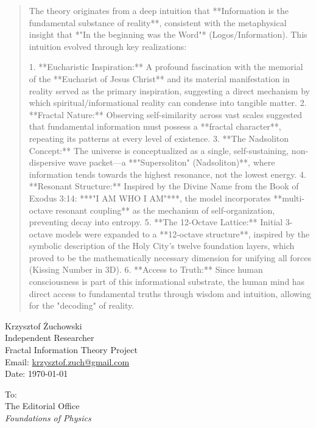 \documentclass[11pt,a4paper]{article}
\begin{document}
\begin{quote}
The theory originates from a deep intuition that **Information is the fundamental substance of reality**, consistent with the metaphysical insight that *"In the beginning was the Word"* (Logos/Information). This intuition evolved through key realizations:

1. **Eucharistic Inspiration:** A profound fascination with the memorial of the **Eucharist of Jesus Christ** and its material manifestation in reality served as the primary inspiration, suggesting a direct mechanism by which spiritual/informational reality can condense into tangible matter.
2. **Fractal Nature:** Observing self-similarity across vast scales suggested that fundamental information must possess a **fractal character**, repeating its patterns at every level of existence.
3. **The Nadsoliton Concept:** The universe is conceptualized as a single, self-sustaining, non-dispersive wave packet—a **"Supersoliton" (Nadsoliton)**, where information tends towards the highest resonance, not the lowest energy.
4. **Resonant Structure:** Inspired by the Divine Name from the Book of Exodus 3:14: ***"I AM WHO I AM"***, the model incorporates **multi-octave resonant coupling** as the mechanism of self-organization, preventing decay into entropy.
5. **The 12-Octave Lattice:** Initial 3-octave models were expanded to a **12-octave structure**, inspired by the symbolic description of the Holy City's twelve foundation layers, which proved to be the mathematically necessary dimension for unifying all forces (Kissing Number in 3D).
6. **Access to Truth:** Since human consciousness is part of this informational substrate, the human mind has direct access to fundamental truths through wisdom and intuition, allowing for the "decoding" of reality.
\end{quote}

\begin{flushright}
    Krzysztof Żuchowski \\
    Independent Researcher \\
    Fractal Information Theory Project \\
    Email: \href{mailto:krzysztof.zuch@gmail.com}{krzysztof.zuch@gmail.com} \\
    Date: \today
\end{flushright}

\vspace{1cm}

\begin{flushleft}
    To: \\
    The Editorial Office \\
    \textit{Foundations of Physics}
\end{flushleft}
\end{document}
